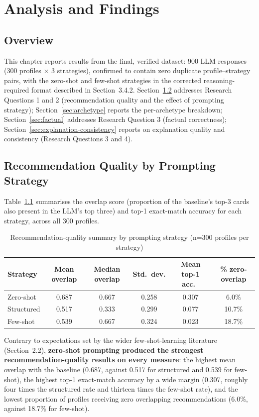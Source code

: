 \chapter{Analysis and Findings}
\label{ch:analysis}

\section{Overview}

This chapter reports results from the final, verified dataset: 900 LLM responses (300 profiles $\times$ 3 strategies), confirmed to contain zero duplicate profile--strategy pairs, with the zero-shot and few-shot strategies in the corrected reasoning-required format described in Section~3.4.2. Section~\ref{sec:rq1rq2} addresses Research Questions 1 and 2 (recommendation quality and the effect of prompting strategy); Section~\ref{sec:archetype} reports the per-archetype breakdown; Section~\ref{sec:factual} addresses Research Question 3 (factual correctness); Section~\ref{sec:explanation-consistency} reports on explanation quality and consistency (Research Questions 3 and 4).

\section{Recommendation Quality by Prompting Strategy}
\label{sec:rq1rq2}

Table~\ref{tab:overlap-summary} summarises the overlap score (proportion of the baseline's top-3 cards also present in the LLM's top three) and top-1 exact-match accuracy for each strategy, across all 300 profiles.

\begin{table}[htbp]
\centering
\caption{Recommendation-quality summary by prompting strategy (n=300 profiles per strategy)}
\label{tab:overlap-summary}
\begin{tabular}{lccccc}
\toprule
Strategy & Mean overlap & Median overlap & Std.\ dev. & Mean top-1 acc.\ & \% zero-overlap \\
\midrule
Zero-shot   & 0.687 & 0.667 & 0.258 & 0.307 & 6.0\% \\
Structured  & 0.517 & 0.333 & 0.299 & 0.077 & 10.7\% \\
Few-shot    & 0.539 & 0.667 & 0.324 & 0.023 & 18.7\% \\
\bottomrule
\end{tabular}
\end{table}

Contrary to expectations set by the wider few-shot-learning literature (Section~2.2), \textbf{zero-shot prompting produced the strongest recommendation-quality results on every measure}: the highest mean overlap with the baseline (0.687, against 0.517 for structured and 0.539 for few-shot), the highest top-1 exact-match accuracy by a wide margin (0.307, roughly four times the structured rate and thirteen times the few-shot rate), and the lowest proportion of profiles receiving zero overlapping recommendations (6.0\%, against 18.7\% for few-shot).

